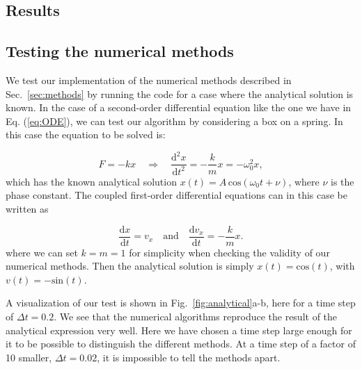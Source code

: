 \documentclass{article}
\begin{document}
\begin{multicols}{2}
\section{Results}

\subsection{Testing the numerical methods}\label{sec:analytical_test}

We test our implementation of the numerical methods described in Sec.~\ref{sec:methods} by running the code for a case where the analytical solution is known. In the case of a second-order differential equation like the one we have in Eq. (\ref{eq:ODE}), we can test our algorithm by considering a box on a spring. In this case the equation to be solved is:

\begin{equation}
	F = -kx \quad \Rightarrow \quad \frac{\mathrm{d}^2 x}{\mathrm{d}t^2} = - \frac{k}{m}x = - \omega_0^2 x,
\end{equation}
which has the known analytical solution $x(t) = A \, \mathrm{cos}(\omega_0 t + \nu)$, where $\nu$ is the phase constant. The coupled first-order differential equations can in this case be written as

\begin{equation}
	\frac{\mathrm{d}x}{\mathrm{d}t} = v_x  \quad \mathrm{and} \quad \frac{\mathrm{d}v_x}{\mathrm{d}t} = - \frac{k}{m} x.
\end{equation}
where we can set $k = m = 1$ for simplicity when checking the validity of our numerical methods. Then the analytical solution is simply $x(t) = \mathrm{cos}(t)$, with $v(t) = - \mathrm{sin}(t)$.

A visualization of our test is shown in Fig.~\ref{fig:analytical}a-b, here for a time step of $\Delta t = 0.2$. We see that the numerical algorithms reproduce the result of the analytical expression very well. Here we have chosen a time step large enough for it to be possible to distinguish the different methods. At a time step of a factor of 10 smaller, $\Delta t = 0.02$, it is impossible to tell the methods apart. \\


\end{multicols}
\end{document}
